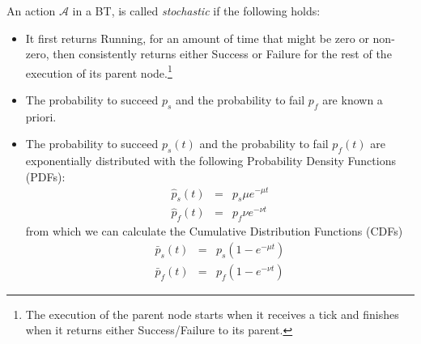 \begin{definition}
\label{stoch:def:stoc}
An action $\mathcal{A}$ in a BT, is called \emph{stochastic}
 if the following holds:
\begin{itemize}
\item
It first returns Running, for an amount of time that might be zero or non-zero, then consistently returns either Success or Failure for the rest of the execution of its parent node.\footnote{The execution of the parent node starts when it receives a tick and finishes when it returns either Success/Failure to its parent.}
\item The probability to succeed $ p_s$ and the probability to fail $ p_f$ are known a priori.
\item The probability to succeed  $p_s(t)$ and the probability to fail $p_f(t)$ are exponentially distributed with the following Probability Density Functions (PDFs):
\begin{eqnarray}
 \hat p_s(t)&=& p_s \mu e^{-\mu t}\\
  \hat p_f(t)&=& p_f \nu e^{-\nu t}
\end{eqnarray}
from which we can calculate the Cumulative Distribution Functions (CDFs)
\begin{eqnarray}
 \bar p_s(t)&=& p_s 	(1- e^{-\mu t})\\
  \bar p_f(t)&=& p_f (1- e^{-\nu t})
\end{eqnarray}
\end{itemize} 
\end{definition}
